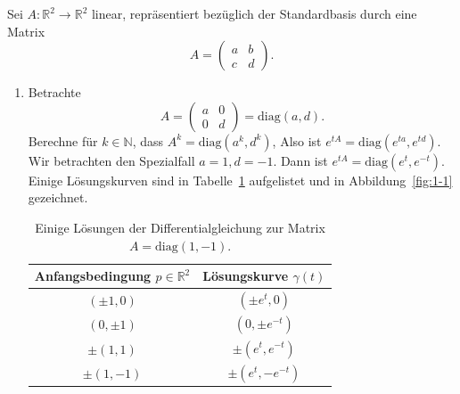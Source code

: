 \documentclass[../main.tex]{subfiles}
\begin{document}
\begin{examples}
  Sei $A \colon \mathbb{R}^2 \to \mathbb{R}^2$ linear,
  repräsentiert bezüglich der Standardbasis
  durch eine Matrix
  \[
    A =
    \begin{pmatrix}
      a & b \\ c & d
    \end{pmatrix}.
  \]
  \begin{enumerate}[(1)]
    \item Betrachte
      \[
        A =
        \begin{pmatrix}
          a & 0 \\ 0 & d
        \end{pmatrix} = \text{diag}(a, d).
      \]
      Berechne für $k \in \mathbb{N}$, dass
      \(
        A^k =
        \text{diag}(a^k, d^k)
      \),
      Also ist
      \(
        e^{tA} =
        \text{diag}(
        e^{ta}, e^{td})
      \).
      Wir betrachten den Spezialfall $a = 1, d = -1$.
      Dann ist
      \(
        e^{tA} = 
        \text{diag}(
          e^t, e^{-t}
          )
      \).
      Einige Lösungskurven sind in
      Tabelle~\ref{tab:1-1}
      aufgelistet und in Abbildung~\ref{fig:1-1}
      gezeichnet. 
      
      \begin{table}[htb]
        \center
        \begin{tabular}{c|c}
          Anfangsbedingung $p \in \mathbb{R}^2$ & Lösungskurve $\gamma(t)$\\
          \hline
          $(\pm 1, 0)$ & $( \pm e^t, 0)$ \\
          $(0, \pm 1)$ & $(0, \pm e^{-t})$ \\
          $\pm(1, 1)$ & $\pm(e^t, e^{-t})$ \\
          $\pm (1, -1)$ & $\pm (e^t, -e^{-t})$
        \end{tabular}
        \caption{Einige Lösungen der Differentialgleichung
        zur Matrix $A = \text{diag}(1, -1)$.}%
        \label{tab:1-1}
      \end{table}


\end{enumerate}
\end{examples}
\end{document}

